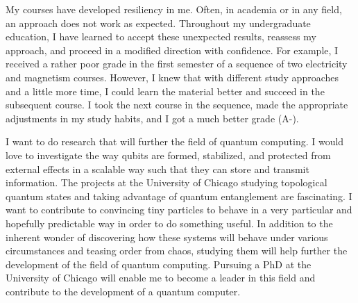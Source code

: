 {    My courses have developed resiliency in me. Often, in academia or in any
    field, an approach does not work as expected. Throughout my undergraduate
    education, I have learned to accept these unexpected results, reassess my
    approach, and proceed in a modified direction with confidence.  For
    example, I received a rather poor grade in the first semester of a sequence
    of two electricity and magnetism courses. However, I knew that with
    different study approaches and a little more time, I could learn the
    material better and succeed in the subsequent course. I took the next
    course in the sequence, made the appropriate adjustments in my study
    habits, and I got a much better grade (A-).

    I want to do research that will further the field of quantum computing. I
    would love to investigate the way qubits are formed, stabilized, and
    protected from external effects in a scalable way such that they can store
    and transmit information. The projects at the University of Chicago
    studying topological quantum states and taking advantage of quantum
    entanglement are fascinating. I want to contribute to convincing tiny
    particles to behave in a very particular and hopefully predictable way in
    order to do something useful. In addition to the inherent wonder of
    discovering how these systems will behave under various circumstances and
    teasing order from chaos, studying them will help further the development
    of the field of quantum computing. Pursuing a PhD at the University of
    Chicago will enable me to become a leader in this field and contribute to
    the development of a quantum computer.
}



